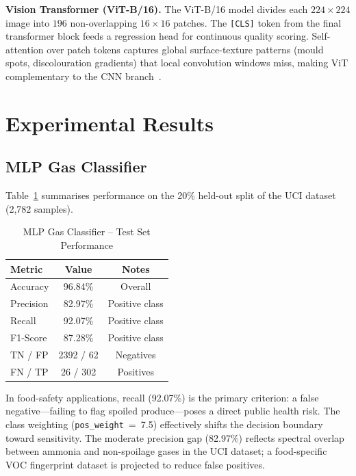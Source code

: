 \documentclass[conference]{IEEEtran}
\begin{document}
\textbf{Vision Transformer (ViT-B/16).} The ViT-B/16 model divides
each $224 \times 224$ image into $196$ non-overlapping $16{\times}16$
patches. The \texttt{[CLS]} token from the final transformer block feeds
a regression head for continuous quality scoring. Self-attention over
patch tokens captures global surface-texture patterns (mould spots,
discolouration gradients) that local convolution windows miss, making
ViT complementary to the CNN branch~\cite{Gao2024}.

\section{Experimental Results}
\label{sec:results}

\subsection{MLP Gas Classifier}

Table~\ref{tab:mlp} summarises performance on the 20\% held-out split
of the UCI dataset (2,782 samples).

\begin{table}[H]
\centering
\caption{MLP Gas Classifier -- Test Set Performance}
\label{tab:mlp}
\setlength{\tabcolsep}{4pt}
\begin{tabular}{lcc}
\toprule
\textbf{Metric} & \textbf{Value} & \textbf{Notes} \\
\midrule
Accuracy    & 96.84\%  & Overall \\
Precision   & 82.97\%  & Positive class \\
Recall      & 92.07\%  & Positive class \\
F1-Score    & 87.28\%  & Positive class \\
TN / FP     & 2392 / 62  & Negatives \\
FN / TP     & 26 / 302   & Positives \\
\bottomrule
\end{tabular}
\end{table}

In food-safety applications, recall (92.07\%) is the primary criterion:
a false negative---failing to flag spoiled produce---poses a direct
public health risk. The class weighting (\texttt{pos\_weight}~=~7.5)
effectively shifts the decision boundary toward sensitivity. The moderate
precision gap (82.97\%) reflects spectral overlap between ammonia and
non-spoilage gases in the UCI dataset; a food-specific VOC fingerprint
dataset is projected to reduce false positives.
\end{document}
